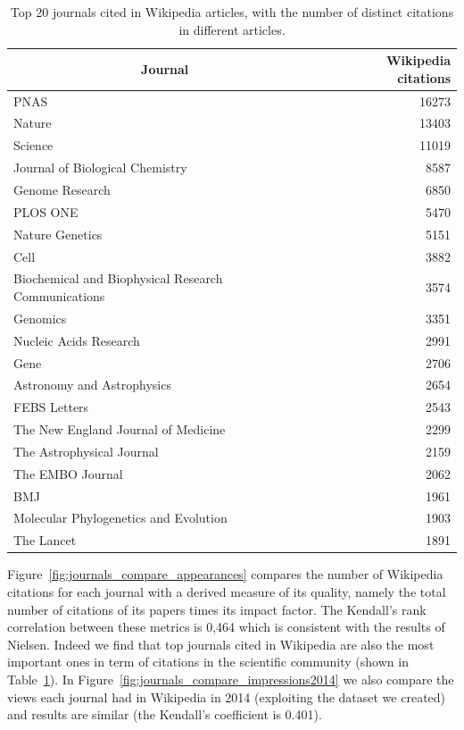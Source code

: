\begin{table}[]
\centering
\begin{tabular}{@{}lr@{}}
\toprule
\multicolumn{1}{c}{\textbf{Journal}} & \textbf{Wikipedia citations} \\ \midrule
PNAS  &  16273 \\
Nature  &  13403 \\
Science  &  11019 \\
Journal of Biological Chemistry  &  8587 \\
Genome Research  &  6850 \\
PLOS ONE  &  5470 \\
Nature Genetics  &  5151 \\
Cell  &  3882 \\
Biochemical and Biophysical Research Communications  &  3574 \\
Genomics  &  3351 \\
Nucleic Acids Research  &  2991 \\
Gene  &  2706 \\
Astronomy and Astrophysics  &  2654 \\
FEBS Letters  &  2543 \\
The New England Journal of Medicine  &  2299 \\
The Astrophysical Journal  &  2159 \\
The EMBO Journal  &  2062 \\
BMJ  &  1961 \\
Molecular Phylogenetics and Evolution  &  1903 \\
The Lancet  &  1891 \\
\bottomrule
\end{tabular}
\caption{Top 20 journals cited in Wikipedia articles, with the number of distinct citations in different articles.}
\label{tbl:top20_cited_wikipedia_journals}
\end{table}

Figure~\ref{fig:journals_compare_appearances} compares the number of Wikipedia citations for each journal with a derived measure of its quality, namely the total number of citations of its papers times its impact factor.
The Kendall's rank correlation between these metrics is 0,464 which is consistent with the results of Nielsen.
Indeed we find that top journals cited in Wikipedia are also the most important ones in term of citations in the scientific community (shown in Table~\ref{tbl:top20_cited_wikipedia_journals}).
In Figure~\ref{fig:journals_compare_impressions2014} we also compare the views each journal had in Wikipedia in 2014 (exploiting the dataset we created) and results are similar (the Kendall's coefficient is 0.401).

